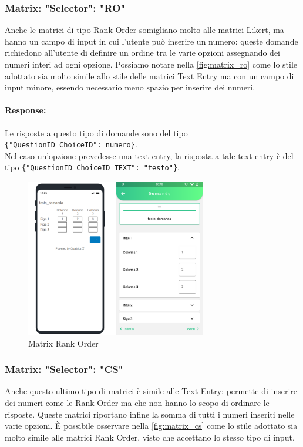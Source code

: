 \clearpage
\subsubsection{Matrix: "Selector": "RO"}
Anche le matrici di tipo Rank Order somigliano molto alle matrici Likert, ma hanno un campo di input in cui l'utente può inserire un numero: queste domande richiedono all'utente di definire un ordine tra le varie opzioni assegnando dei numeri interi ad ogni opzione. Possiamo notare nella \autoref{fig:matrix_ro} come lo stile adottato sia molto simile allo stile delle matrici Text Entry ma con un campo di input minore, essendo necessario meno spazio per inserire dei numeri.

\paragraph{Response:}
Le risposte a questo tipo di domande sono del tipo\\ \texttt{\{"QuestionID\_ChoiceID": numero\}}.\\Nel caso un'opzione prevedesse una text entry, la risposta a tale text entry è del tipo \texttt{\{"QuestionID\_ChoiceID\_TEXT": "testo"\}}.

\begin{figure}[h!]
\centering
\includegraphics[width=0.7\textwidth]{img/matrix_ro}
\caption{Matrix Rank Order}
\label{fig:matrix_ro}
\end{figure}

\clearpage
\subsubsection{Matrix: "Selector": "CS"}
Anche questo ultimo tipo di matrici è simile alle Text Entry: permette di inserire dei numeri come le Rank Order ma che non hanno lo scopo di ordinare le risposte. Queste matrici riportano infine la somma di tutti i numeri inseriti nelle varie opzioni. È possibile osservare nella \autoref{fig:matrix_cs} come lo stile adottato sia molto simile alle matrici Rank Order, visto che accettano lo stesso tipo di input.

